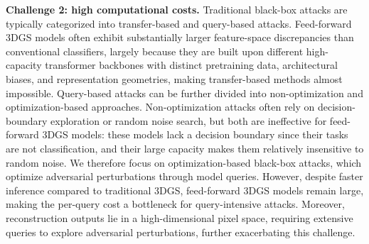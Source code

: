 \documentclass[runningheads]{llncs}
\begin{document}
\textbf{Challenge 2: high computational costs. } Traditional black-box attacks are typically categorized into transfer-based and query-based attacks. Feed-forward 3DGS models often exhibit substantially larger feature-space discrepancies than conventional classifiers, largely because they are built upon different high-capacity transformer backbones\cite{wang2025vggt,yang2024depth} with distinct pretraining data, architectural biases, and representation geometries, making transfer-based methods almost impossible. Query-based attacks can be further divided into non-optimization\cite{andriushchenko2020square,guo2019simple,brendel2017decision} and optimization-based\cite{ilyas2018black} approaches. Non-optimization attacks often rely on decision-boundary exploration or random noise search, but both are ineffective for feed-forward 3DGS models: these models lack a decision boundary since their tasks are not classification, and their large capacity makes them relatively insensitive to random noise. We therefore focus on optimization-based black-box attacks, which optimize adversarial perturbations through model queries. However, despite faster inference compared to traditional 3DGS, feed-forward 3DGS models remain large, making the per-query cost a bottleneck for query-intensive attacks. Moreover, reconstruction outputs lie in a high-dimensional pixel space, requiring extensive queries to explore adversarial perturbations, further exacerbating this challenge.
\end{document}
